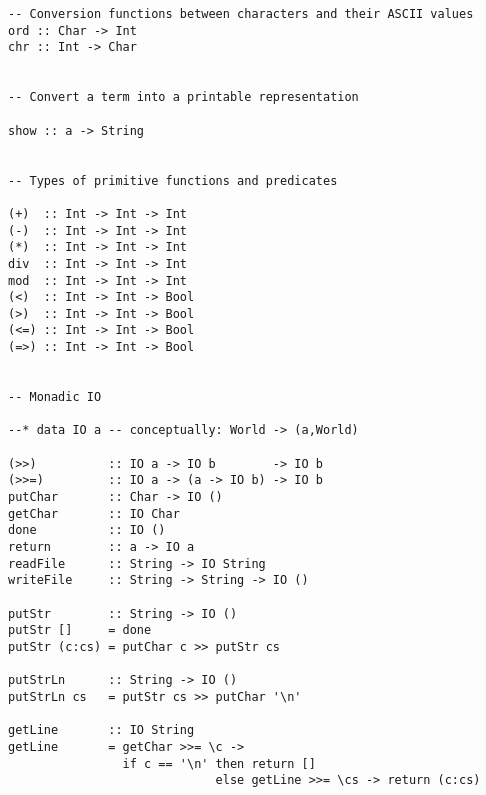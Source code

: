 \documentclass[titlepage,fleqn]{article}
\begin{document}
{\begin{verbatim}
-- Conversion functions between characters and their ASCII values
ord :: Char -> Int
chr :: Int -> Char


-- Convert a term into a printable representation

show :: a -> String


-- Types of primitive functions and predicates

(+)  :: Int -> Int -> Int          
(-)  :: Int -> Int -> Int          
(*)  :: Int -> Int -> Int          
div  :: Int -> Int -> Int
mod  :: Int -> Int -> Int
(<)  :: Int -> Int -> Bool      
(>)  :: Int -> Int -> Bool      
(<=) :: Int -> Int -> Bool      
(=>) :: Int -> Int -> Bool      


-- Monadic IO

--* data IO a -- conceptually: World -> (a,World)

(>>)          :: IO a -> IO b        -> IO b
(>>=)         :: IO a -> (a -> IO b) -> IO b
putChar       :: Char -> IO ()
getChar       :: IO Char
done          :: IO ()
return        :: a -> IO a
readFile      :: String -> IO String
writeFile     :: String -> String -> IO ()

putStr        :: String -> IO ()
putStr []     = done
putStr (c:cs) = putChar c >> putStr cs

putStrLn      :: String -> IO ()
putStrLn cs   = putStr cs >> putChar '\n'

getLine       :: IO String
getLine       = getChar >>= \c -> 
                if c == '\n' then return []
                             else getLine >>= \cs -> return (c:cs)
\end{verbatim}
}
\end{document}
